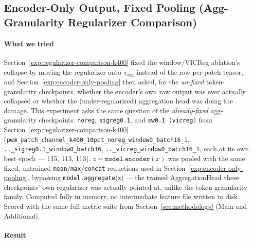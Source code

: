 \subsection{Encoder-Only Output, Fixed Pooling (Agg-Granularity Regularizer Comparison)}
\label{exp:encoder-only-pooling-agg}

\paragraph{What we tried} Section~\ref{exp:regularizer-comparison-k400} fixed the
window/VICReg ablation's collapse by moving the regularizer onto $z_{\mathrm{agg}}$
instead of the raw per-patch tensor, and Section~\ref{exp:encoder-only-pooling} then
asked, for the \emph{un-fixed} token-granularity checkpoints, whether the encoder's own
raw output was ever actually collapsed or whether the (under-regularized) aggregation
head was doing the damage. This experiment asks the same question of the
\emph{already-fixed} agg-granularity checkpoints: \texttt{noreg},
\texttt{sigreg0.1}, and \texttt{sw0.1 (vicreg)} from
Section~\ref{exp:regularizer-comparison-k400}
(\texttt{pwm\_patch\_channel\_k400\_10pct\_noreg\_window0\_batch16\_1},
\texttt{..\_sigreg0.1\_window0\_batch16}, \texttt{..\_vicreg\_window0\_batch16\_1}, each
at its own best epoch --- 115, 113, 113). $z = \texttt{model.encoder}(x)$ was pooled with
the same fixed, untrained \texttt{mean}/\texttt{max}/\texttt{concat} reductions used in
Section~\ref{exp:encoder-only-pooling}, bypassing \texttt{model.aggregate}(z) --- the
trained AggregationHead these checkpoints' own regularizer was actually pointed at,
unlike the token-granularity family. Computed fully in memory, no intermediate feature
file written to disk. Scored with the same full metric suite from
Section~\ref{sec:methodology} (Main and Additional).

\paragraph{Result}

